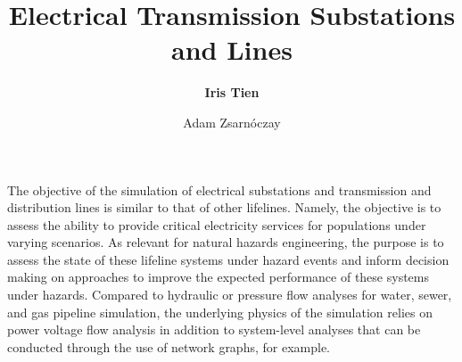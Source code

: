%
%
%


%
%
%
%
%
%
%
%

\title{Electrical Transmission Substations and Lines}
\author{
    \textbf{Iris Tien}
    \and Adam Zsarnóczay}
\tocauthor{}
%
%
\maketitle

The objective of the simulation of electrical substations and transmission and distribution lines is similar to that of other lifelines. Namely, the objective is to assess the ability to provide critical electricity services for populations under varying scenarios. As relevant for natural hazards engineering, the purpose is to assess the state of these lifeline systems under hazard events and inform decision making on approaches to improve the expected performance of these systems under hazards. Compared to hydraulic or pressure flow analyses for water, sewer, and gas pipeline simulation, the underlying physics of the simulation relies on power voltage flow analysis in addition to system-level analyses that can be conducted through the use of network graphs, for example.
 
